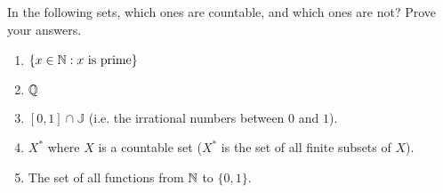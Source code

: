 \subsection{} %
In the following sets, which ones are countable, and which ones are not?
Prove your answers.
\begin{enumerate}
	\item \(\{x \in \mathbb{N}: x \textnormal{ is prime}\}\)
	\item \(\mathbb{Q}\)
	\item \([0, 1] \cap \mathbb{J}\)
	(i.e. the irrational numbers between \(0\) and \(1\)).
	\item \(X^*\) where \(X\) is a countable set
	(\(X^*\) is the set of all finite subsets of \(X\)).
	\item The set of all functions from \(\mathbb{N}\) to \(\{0, 1\}\).
\end{enumerate}

